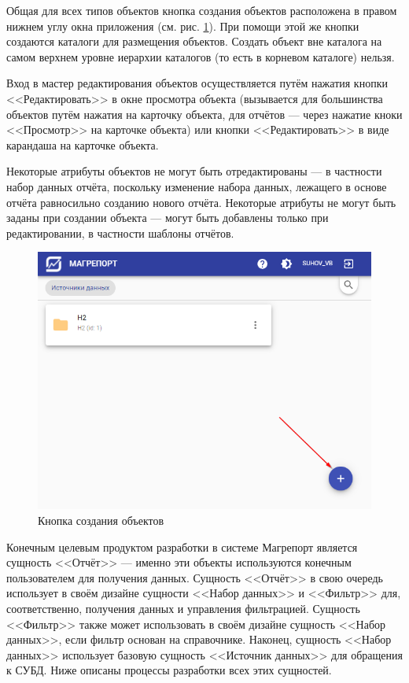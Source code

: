 \documentclass[../user-manual.tex]{subfiles}
\begin{document}
	Общая для всех типов объектов кнопка создания объектов расположена в правом нижнем углу окна приложения (см. рис. \ref{fig:create-object-button}). При помощи этой же кнопки создаются каталоги для размещения объектов. Создать объект вне каталога на самом верхнем уровне иерархии каталогов (то есть в корневом каталоге) нельзя.
	
	Вход в мастер редактирования объектов осуществляется путём нажатия кнопки <<Редактировать>> в окне просмотра объекта (вызывается для большинства объектов путём нажатия на карточку объекта, для отчётов --- через нажатие кноки <<Просмотр>> на карточке объекта) или кнопки <<Редактировать>> в виде карандаша на карточке объекта.
	
	Некоторые атрибуты объектов не могут быть отредактированы --- в частности набор данных отчёта, поскольку изменение набора данных, лежащего в основе отчёта равносильно созданию нового отчёта. Некоторые атрибуты не могут быть заданы при создании объекта --- могут быть добавлены только при редактировании, в частности шаблоны отчётов.
	

	\begin{figure}[h]
		\centering
		\includegraphics[width=\graphicswidth]{img/1-create-object-button.png}
		\caption{Кнопка создания объектов}
		\label{fig:create-object-button}
	\end{figure}

	Конечным целевым продуктом разработки в системе Магрепорт является сущность <<Отчёт>> --- именно эти объекты используются конечным пользователем для получения данных. Сущность <<Отчёт>> в свою очередь использует в своём дизайне сущности <<Набор данных>> и <<Фильтр>> для, соответственно, получения данных и управления фильтрацией. Сущность <<Фильтр>> также может использовать в своём дизайне сущность <<Набор данных>>, если фильтр основан на справочнике. Наконец, сущность <<Набор данных>> использует базовую сущность <<Источник данных>> для обращения к СУБД. Ниже описаны процессы разработки всех этих сущностей.
	
\end{document}
